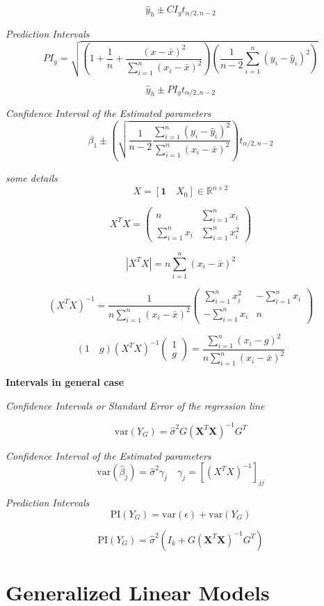 \documentclass[12pt,a4paper]{article}
\begin{document}
\[
\hat{y}_h \pm CI_y t_{\alpha/2,n-2}
\]

\textit{Prediction Intervals}
\[
PI_y = \sqrt{
\left(
1+\frac{1}{n}+\frac{(x-\bar{x})^2}{\sum_{i=1}^{n}(x_i-\bar{x})^2}
\right)\left(\frac{1}{n-2}\sum_{i=1}^{n}(y_i-\hat{y}_i)^2 \right)
}
\]

\[
\hat{y}_h \pm PI_y t_{\alpha/2,n-2}
\]

\textit{Confidence Interval of the Estimated parameters}
\[
	\beta_1 \pm \left(
	\sqrt{\frac{1}{n-2}\frac{\sum_{i=1}^{n}(y_i-\hat{y}_i)^2}{\sum_{i=1}^{n}(x_i-\bar{x})^2}}
	\right)t_{\alpha/2,n-2}
\]


\textit{some details}
\[
	X = [ \mathbf{1} \quad X_0] \in \mathbb{R}^{n \times 2}
\]

\[
	X^TX = \left(\begin{matrix}
	n & \sum_{i=1}^{n} x_i \\
	\sum_{i=1}^{n} x_i & \sum_{i=1}^{n} x_i^2
	\end{matrix}\right)
\]

\[
|X^TX| = n\sum_{i=1}^n (x_i - \bar{x})^2
\]

\[
	(X^TX)^{-1} = \frac{1}{n\sum_{i=1}^n (x_i - \bar{x})^2}\left(\begin{matrix}
	\sum_{i=1}^{n} x_i^2 & -\sum_{i=1}^{n} x_i \\
	-\sum_{i=1}^{n} x_i & n
	\end{matrix}\right)
\]

\[
	(1 \quad g)(X^TX)^{-1} \left(\begin{matrix}
	1 \\ g
	\end{matrix}\right) = \frac{\sum_{i=1}^{n}(x_i-g)^2}{ n\sum_{i=1}^n (x_i - \bar{x})^2}
\]

\textbf{Intervals in general case}

\textit{Confidence Intervals or Standard Error of the regression line}

\[
\mathrm{var}(Y_G) = \hat{\sigma}^2G(\mathbf{X}^T\mathbf{X})^{-1}G^T
\]

\textit{Confidence Interval of the Estimated parameters}
\[
\mathrm{var}(\hat{\beta}_j) = \hat{\sigma}^2\gamma_j \quad \gamma_j = [(X^TX)^{-1}]_{jj}
\]

\textit{Prediction Intervals}
\[
\mathrm{PI}(Y_G) = \mathrm{var}(\epsilon) + \mathrm{var}(Y_G)
\]

\[
\mathrm{PI}(Y_G) = \hat{\sigma}^2(I_k+G(\mathbf{X}^T\mathbf{X})^{-1}G^T)
\]

\section{Generalized Linear Models}
\end{document}

